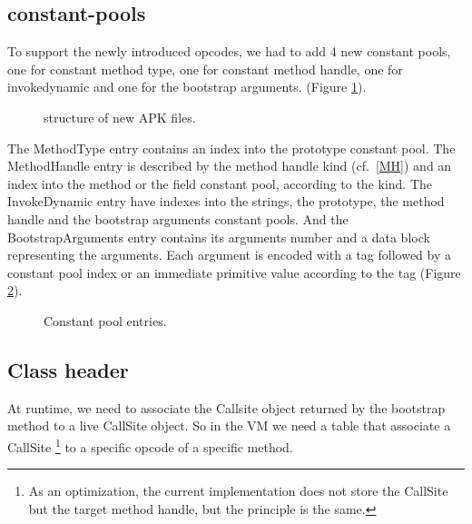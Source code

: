 \documentclass{sig-alternate}
\begin{document}
  \subsection{constant-pools}
    \label{CP}

    To support the newly introduced opcodes, we had to add 4 new constant pools,
    one for constant method type, one for constant method handle, one for invokedynamic
    and one for the bootstrap arguments. (Figure \ref{SNA}).

    \begin{figure}[!h]
      \centering \resizebox{.45\linewidth}{!}{}
      \caption{structure of new APK files.}
      \label{SNA}
    \end{figure}

    The MethodType entry contains an index into the prototype constant pool.
    The MethodHandle entry is described by the method handle kind (cf.~\ref{MH})
    and an index into the method or the field constant pool, according to the kind.
    The InvokeDynamic entry have indexes into the strings, the prototype,
    the method handle and the bootstrap arguments constant pools.
    And the BootstrapArguments entry contains its arguments number
    and a data block representing the arguments.
    Each argument is encoded with a tag followed by a constant pool index or
    an immediate primitive value according to the tag (Figure \ref{CPentries}).

    \begin{figure}[!h]
      \centering 
      \centering 
      \centering 
      \centering \vspace{-1.5em}
      \caption{Constant pool entries.}
      \label{CPentries}
    \end{figure}

  \subsection{Class header}

    At runtime, we need to associate the Callsite object returned by the bootstrap method
    to a live CallSite object. So in the VM we need a table that associate a CallSite
    \footnote{As an optimization, the current implementation does not store the CallSite
     but the target method handle, but the principle is the same.}
    to a specific opcode of a specific method.
\end{document}
